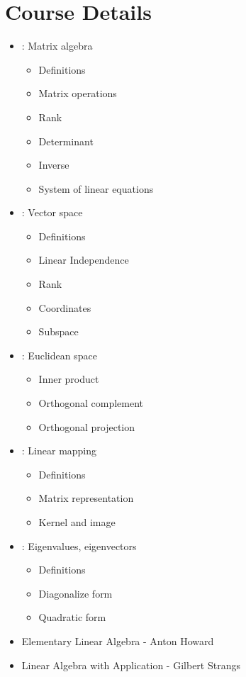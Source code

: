 \chapter*{Course Details}
    \begin{itemize}
        \item {}: Matrix algebra
            \begin{itemize}
                \item Definitions
                \item Matrix operations
                \item Rank
                \item Determinant
                \item Inverse
                \item System of linear equations
            \end{itemize}
        \item {}: Vector space
            \begin{itemize}
                \item Definitions
                \item Linear Independence
                \item Rank
                \item Coordinates
                \item Subspace
            \end{itemize}
        \par {}
        \item {}: Euclidean space
            \begin{itemize}
                \item Inner product
                \item Orthogonal complement
                \item Orthogonal projection
            \end{itemize}
        \item {}: Linear mapping
            \begin{itemize}
                \item Definitions
                \item Matrix representation
                \item Kernel and image
            \end{itemize}
        \item {}: Eigenvalues, eigenvectors
            \begin{itemize}
                \item Definitions
                \item Diagonalize form
                \item Quadratic form
            \end{itemize}
    \end{itemize}

    \begin{itemize}
        \item Elementary Linear Algebra - Anton Howard
        \item Linear Algebra with Application - Gilbert Strangs
    \end{itemize}
